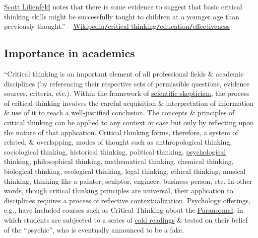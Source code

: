 \documentclass[oneside]{book}
\numberwithin{equation}{section}
\begin{document}
\href{https://en.wikipedia.org/wiki/Scott_Lilienfeld}{Scott Lilienfeld} notes that there is some evidence to suggest that basic critical thinking skills might be successfully taught to children at a younger age than previously thought.'' -- \href{https://en.wikipedia.org/wiki/Critical_thinking#Effectiveness}{Wikipedia\texttt{/}critical thinking\texttt{/}education\texttt{/}effectiveness}

\subsection{Importance in academics}
``Critical thinking is an important element of all professional fields \& academic disciplines (by referencing their respective sets of permissible questions, evidence sources, criteria, etc.). Within the framework of \href{https://en.wikipedia.org/wiki/Scientific_skepticism}{scientific skepticism}, the process of critical thinking involves the careful acquisition \& interpretation of information \& use of it to reach a \href{https://en.wikipedia.org/wiki/Theory_of_justification}{well-justified} conclusion. The concepts \& principles of critical thinking can be applied to any context or case but only by reflecting upon the nature of that application. Critical thinking forms, therefore, a system of related, \& overlapping, modes of thought such as anthropological thinking, sociological thinking, historical thinking, political thinking, \href{https://en.wikipedia.org/wiki/Psychological}{psychological} thinking, philosophical thinking, mathematical thinking, chemical thinking, biological thinking, ecological thinking, legal thinking, ethical thinking, musical thinking, thinking like a painter, sculptor, engineer, business person, etc. In other words, though critical thinking principles are universal, their application to disciplines requires a process of reflective \href{https://en.wikipedia.org/wiki/Contextualism}{contextualization}. Psychology offerings, e.g., have included courses such as Critical Thinking about the \href{https://en.wikipedia.org/wiki/Paranormal}{Paranormal}, in which students are subjected to a series of \href{https://en.wikipedia.org/wiki/Cold_reading}{cold readings} \& tested on their belief of the ``psychic'', who is eventually announced to be a fake.
\end{document}
